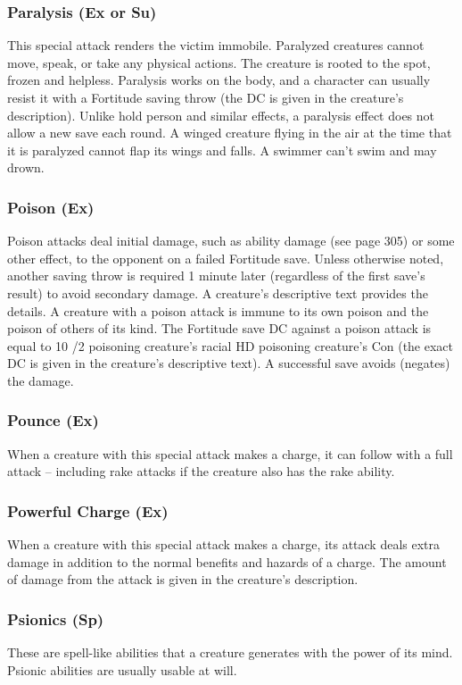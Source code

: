 {\subsubsection{Paralysis (Ex or Su)} This special attack renders the victim immobile. Paralyzed creatures cannot move, speak, or take any physical actions. The creature is rooted to the spot, frozen and helpless. Paralysis works on the body, and a character can usually resist it with a Fortitude saving throw (the DC is given in the creature's description). Unlike hold person and similar effects, a paralysis effect does not allow a new save each round. A winged creature flying in the air at the time that it is paralyzed cannot flap its wings and falls. A swimmer can't swim and may drown. 

\subsubsection{Poison (Ex)} Poison attacks deal initial damage, such as ability damage (see page 305) or some other effect, to the opponent on a failed Fortitude save. Unless otherwise noted, another saving throw is required 1 minute later (regardless of the first save's result) to avoid secondary damage. A creature's descriptive text provides the details.
A creature with a poison attack is immune to its own poison and the poison of others of its kind.
The Fortitude save DC against a poison attack is equal to 10 /2 poisoning creature's racial HD \add poisoning creature's Con (the exact DC is given in the creature's descriptive text).
A successful save avoids (negates) the damage.

\subsubsection{Pounce (Ex)} When a creature with this special attack makes a charge, it can follow with a full attack -- including rake attacks if the creature also has the rake ability.

\subsubsection{Powerful Charge (Ex)} When a creature with this special attack makes a charge, its attack deals extra damage in addition to the normal benefits and hazards of a charge. The amount of damage from the attack is given in the creature's description.

\subsubsection{Psionics (Sp)} These are spell-like abilities that a creature generates with the power of its mind. Psionic abilities are usually usable at will.

}
